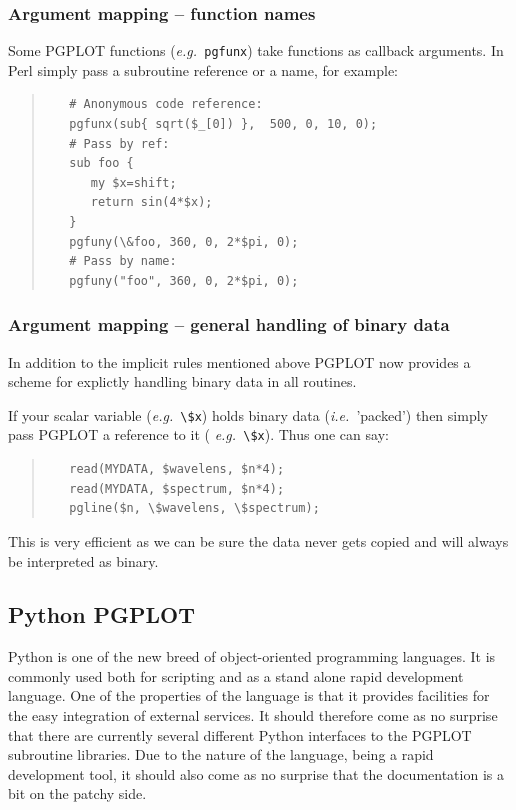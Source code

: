 \documentclass[twoside,11pt]{article}
\newcommand{\htmladdnormallink}[2]{#1}
\newcommand{\xlabel}[1]{}
\begin{document}
\subsubsection{Argument mapping -- function names}

Some PGPLOT functions ({\em e.g.\ }{\tt pgfunx}) take functions as
callback arguments. In Perl simply pass a subroutine reference or a
name, for example:

\small
\begin{quote}
\begin{verbatim}
   # Anonymous code reference:
   pgfunx(sub{ sqrt($_[0]) },  500, 0, 10, 0);
   # Pass by ref:
   sub foo {
      my $x=shift;
      return sin(4*$x);
   }
   pgfuny(\&foo, 360, 0, 2*$pi, 0);
   # Pass by name:
   pgfuny("foo", 360, 0, 2*$pi, 0);
\end{verbatim}
\end{quote}
\normalsize

\subsubsection{Argument mapping -- general handling of binary data}

In addition to the implicit rules mentioned above PGPLOT now provides
a scheme for explictly handling binary data in all routines. 

If your scalar variable ({\em e.g.\ }\verb+\$x+) holds binary data
({\em i.e.\ }'packed') then simply pass PGPLOT a reference to it ({\em
e.g.\ }\verb+\$x+). Thus one can say: 

\small
\begin{quote}
\begin{verbatim}
   read(MYDATA, $wavelens, $n*4);
   read(MYDATA, $spectrum, $n*4);
   pgline($n, \$wavelens, \$spectrum);
\end{verbatim}
\end{quote}
\normalsize

This is very efficient as we can be sure the data never gets copied
and will always be interpreted as binary. 

\subsection{\xlabel{sc15_pgpython}Python PGPLOT\label{sc15_pgpython}}

Python is one of the new breed of object-oriented programming
languages. It is commonly used both for scripting and as a stand alone
rapid development language. One of the properties of the language is
that it provides facilities for the easy integration of external
services. It should therefore come as no surprise that there are
currently
\htmladdnormallink{several}{http://www.geog.ubc.ca/~phil/ubc_python.html}
different Python interfaces to the PGPLOT subroutine libraries. Due to
the nature of the language, being a rapid development tool, it should
also come as no surprise that the documentation is a bit on the patchy
side.
\end{document}
